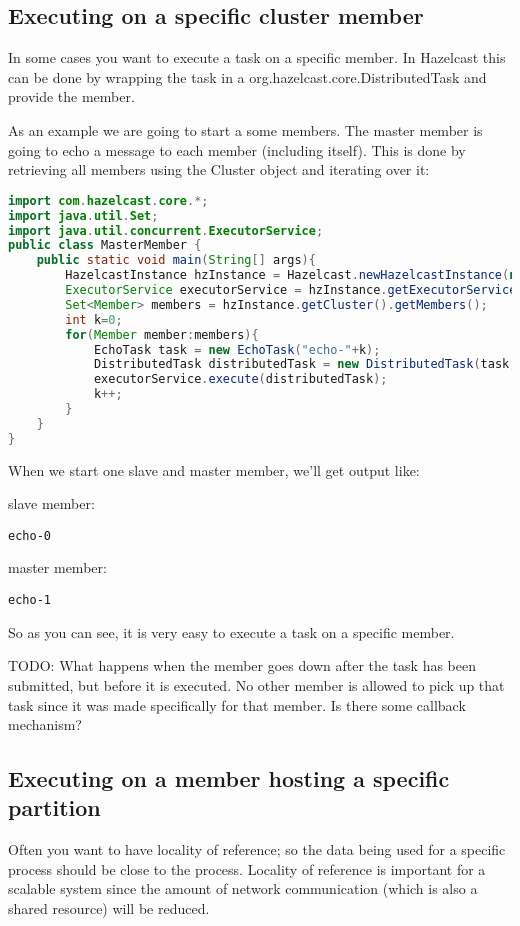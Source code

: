 \subsection{Executing on a specific cluster member}
In some cases you want to execute a task on a specific member. In Hazelcast this can be done by wrapping the task in a org.hazelcast.core.DistributedTask and provide the member.

As an example we are going to start a some members. The master member is going to echo a message to each member (including itself). This is done by retrieving all members using the Cluster object and iterating over it:
\begin{lstlisting}[language=java]
import com.hazelcast.core.*;
import java.util.Set;
import java.util.concurrent.ExecutorService;
public class MasterMember {
    public static void main(String[] args){
        HazelcastInstance hzInstance = Hazelcast.newHazelcastInstance(null);
        ExecutorService executorService = hzInstance.getExecutorService();
        Set<Member> members = hzInstance.getCluster().getMembers();
        int k=0;
        for(Member member:members){
            EchoTask task = new EchoTask("echo-"+k);
            DistributedTask distributedTask = new DistributedTask(task, member);
            executorService.execute(distributedTask);
            k++;
        }
    }
}
\end{lstlisting}
When we start one slave and master member, we'll get output like:

slave member:
\begin{lstlisting}
echo-0
\end{lstlisting}
master member:
\begin{lstlisting}
echo-1
\end{lstlisting}
So as you can see, it is very easy to execute a task on a specific member.

TODO: What happens when the member goes down after the task has been submitted, but before it is executed. No other member is allowed to pick up that task since it was made specifically for that member. Is there some callback mechanism?

\subsection{Executing on a member hosting a specific partition}
Often you want to have locality of reference; so the data being used for a specific process should be close to the process. Locality of reference is important for a scalable system since the amount of network communication (which is also a shared resource) will be reduced.

